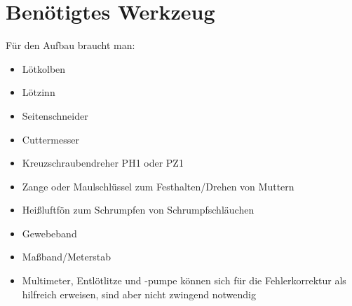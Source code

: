 \documentclass[paper=a4, open=any]{scrbook}
\begin{document}
		\section{Benötigtes Werkzeug}
			Für den Aufbau braucht man:
			\begin{itemize}
				\item Lötkolben
				\item Lötzinn
				\item Seitenschneider
				\item Cuttermesser
				\item Kreuzschraubendreher PH1 oder PZ1
				\item Zange oder Maulschlüssel zum Festhalten/Drehen von Muttern
				\item Heißluftfön zum Schrumpfen von Schrumpfschläuchen
				\item Gewebeband
				\item Maßband/Meterstab
				\item Multimeter, Entlötlitze und -pumpe können sich für die Fehlerkorrektur als hilfreich erweisen, sind aber nicht zwingend notwendig
			\end{itemize}
\end{document}
